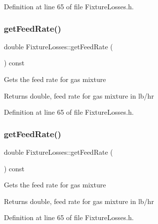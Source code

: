 Definition at line 65 of file Fixture\+Losses.\+h.

\mbox{\label{class_fixture_losses_a09707af8de4b304c65f4aeb1130ea44e}} 
\subsubsection{\texorpdfstring{get\+Feed\+Rate()}{getFeedRate()}\hspace{0.1cm}{\footnotesize\ttfamily [2/3]}}
{\footnotesize\ttfamily double Fixture\+Losses\+::get\+Feed\+Rate (\begin{DoxyParamCaption}{ }\end{DoxyParamCaption}) const\hspace{0.3cm}{\ttfamily [inline]}}

Gets the feed rate for gas mixture \begin{DoxyReturn}{Returns}
double, feed rate for gas mixture in lb/hr 
\end{DoxyReturn}


Definition at line 65 of file Fixture\+Losses.\+h.

\mbox{\label{class_fixture_losses_a09707af8de4b304c65f4aeb1130ea44e}} 
\subsubsection{\texorpdfstring{get\+Feed\+Rate()}{getFeedRate()}\hspace{0.1cm}{\footnotesize\ttfamily [3/3]}}
{\footnotesize\ttfamily double Fixture\+Losses\+::get\+Feed\+Rate (\begin{DoxyParamCaption}{ }\end{DoxyParamCaption}) const\hspace{0.3cm}{\ttfamily [inline]}}

Gets the feed rate for gas mixture \begin{DoxyReturn}{Returns}
double, feed rate for gas mixture in lb/hr 
\end{DoxyReturn}


Definition at line 65 of file Fixture\+Losses.\+h.

